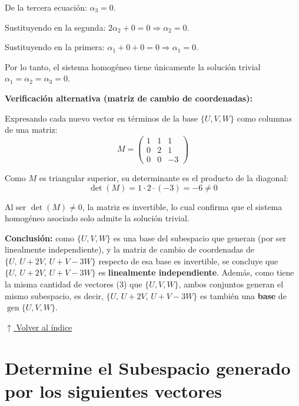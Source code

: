 \documentclass[12pt]{article}
\newcommand{\volverindice}{%
    \vspace{1em}%
    \begin{flushright}%
        \hyperlink{indice}{\small $\uparrow$ Volver al índice}%
    \end{flushright}%
}
\begin{document}
De la tercera ecuación: $\alpha_3=0$.

Sustituyendo en la segunda: $2\alpha_2+0=0 \Rightarrow \alpha_2=0$.

Sustituyendo en la primera: $\alpha_1+0+0=0 \Rightarrow \alpha_1=0$.

Por lo tanto, el sistema homogéneo tiene únicamente la solución trivial $\alpha_1=\alpha_2=\alpha_3=0$.

\textbf{Verificación alternativa (matriz de cambio de coordenadas):}

Expresando cada nuevo vector en términos de la base $\{U,V,W\}$ como columnas de una matriz:
\[
M = \begin{pmatrix} 1 & 1 & 1 \\ 0 & 2 & 1 \\ 0 & 0 & -3 \end{pmatrix}
\]

Como $M$ es triangular superior, su determinante es el producto de la diagonal:
\[
\det(M) = 1\cdot 2\cdot(-3) = -6 \neq 0
\]

Al ser $\det(M)\neq0$, la matriz es invertible, lo cual confirma que el sistema homogéneo asociado solo admite la solución trivial.

\textbf{Conclusión:} como $\{U,V,W\}$ es una base del subespacio que generan (por ser linealmente independiente), y la matriz de cambio de coordenadas de $\{U,\,U+2V,\,U+V-3W\}$ respecto de esa base es invertible, se concluye que $\{U,\,U+2V,\,U+V-3W\}$ es \textbf{linealmente independiente}. Además, como tiene la misma cantidad de vectores ($3$) que $\{U,V,W\}$, ambos conjuntos generan el mismo subespacio, es decir, $\{U,\,U+2V,\,U+V-3W\}$ es también una \textbf{base} de $\operatorname{gen}\{U,V,W\}$.

\volverindice
\newpage

\section{Determine el Subespacio generado por los siguientes vectores}
\end{document}
